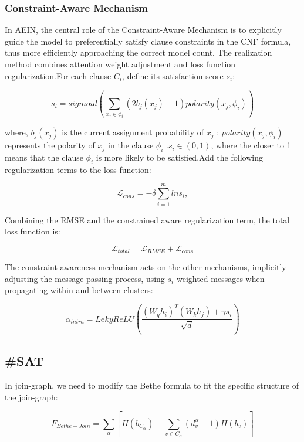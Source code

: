 \subsubsection{Constraint-Aware Mechanism}
In AEIN, the central role of the Constraint-Aware Mechanism is to explicitly guide the model to preferentially satisfy 
clause constraints in the CNF formula, thus more efficiently approaching the correct model count. The realization method 
combines attention weight adjustment and loss function regularization.For each clause \(C_i\), define its satisfaction 
score \(s_i\):

\begin{equation}
s_i=sigmoid(\sum_{x_j\in \phi_i}(2b_j(x_j)-1)polarity(x_j,\phi_i))
\end{equation}

where, \(b_j(x_j)\) is  the current assignment probability of \(x_j\) ;  \(polarity(x_j,\phi_i)\) represents the polarity 
of \(x_j\) in the clause \(\phi_i\) .\(s_i\in (0,1)\), where the closer to 1 means that the clause \(\phi_i\) is more likely 
to be satisfied.Add the following regularization terms to the loss function:

\begin{equation}
\mathcal L_{cons}=-\delta  \sum_{i=1}^mlns_i,
\end{equation}

Combining the RMSE and the constrained aware regularization term, the total loss function is:

\begin{equation}
\mathcal L_{total}=\mathcal L_{RMSE}+\mathcal L_{cons}
\end{equation}

The constraint awareness mechanism acts on the other mechanisms, implicitly adjusting the message passing process, using 
\(s_i\) weighted messages when propagating within and between clusters:

\begin{equation}
\alpha_{intra}=LekyReLU(\frac{(W_qh_i)^T(W_kh_j)+\gamma s_i}{\sqrt{d}})
\end{equation}

\subsection{\#SAT}
In join-graph, we need to modify the Bethe formula to fit the specific structure of the join-graph:

\begin{equation}
   F_{Bethe-Join}=\sum_\alpha [H(b_{C_\alpha})-\sum_{v\in C_\alpha}(d_v^\alpha-1)H(b_v)]
\end{equation}

